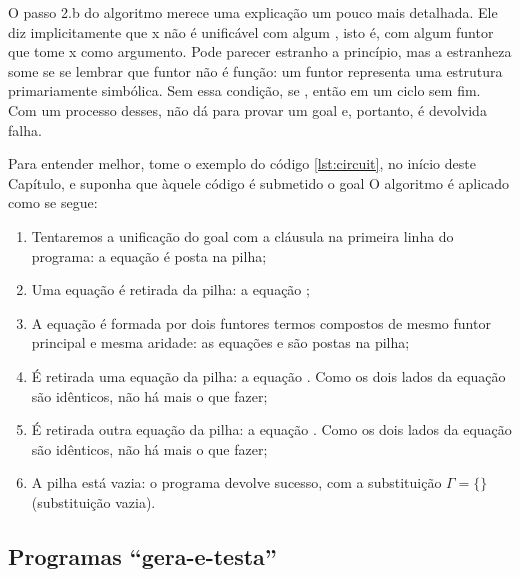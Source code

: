 O passo 2.b do algoritmo merece uma explicação um pouco mais
detalhada. Ele diz implicitamente que x não é unificável com algum
, isto é, com algum funtor que tome x
como argumento. Pode parecer estranho a princípio, mas a estranheza
some se se lembrar que funtor não é função: um funtor representa uma
estrutura primariamente simbólica. Sem essa condição, se , então  em um ciclo
sem fim. Com um processo desses, não dá para provar um goal e,
portanto, é devolvida falha. 

Para entender melhor, tome o exemplo do código \ref{lst:circuit}, no
início deste Capítulo, e suponha que àquele código é submetido o goal
 O algoritmo é aplicado como se segue: 

  \begin{enumerate}
    \item Tentaremos a unificação do goal com a cláusula na primeira
      linha do programa: a equação  é posta na pilha; 
    \item Uma equação é retirada da pilha: a equação ;
    \item A equação é formada por dois funtores termos compostos de
      mesmo funtor principal e mesma aridade: as equações
       e  são postas na
      pilha; 
    \item É retirada uma equação da pilha: a equação . Como os dois lados da equação são idênticos, não há
      mais o que fazer; 
    \item É retirada outra equação da pilha: a equação . Como os dois lados da equação são idênticos, não há mais o que fazer;
    \item A pilha está vazia: o programa devolve sucesso, com a substituição $\Gamma = \{\}$ (substituição vazia).
  \end{enumerate}


  \subsection{Programas ``gera-e-testa''}


